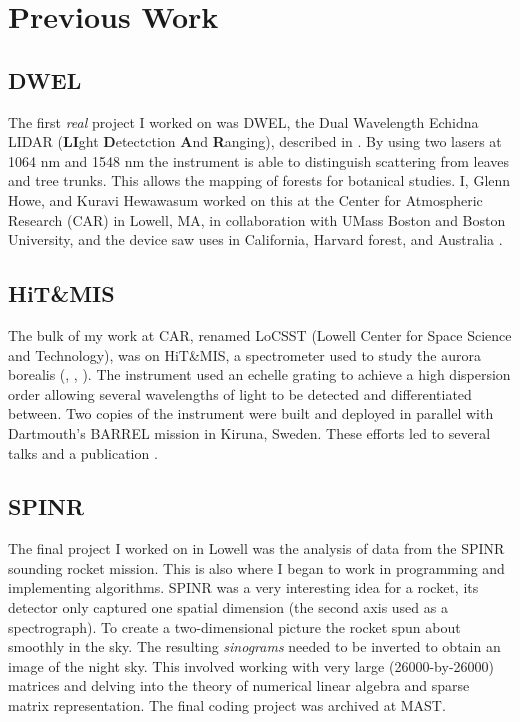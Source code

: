 \documentclass{article}
\theoremstyle{plain}
\begin{document}
    \section{Previous Work}
        \subsection{DWEL}
            The first \textit{real} project I worked on was DWEL, the
            Dual Wavelength Echidna LIDAR
            (\textbf{LI}ght \textbf{D}etectction \textbf{A}nd \textbf{R}anging),
            described in \cite{DWEL2012}.
            By using two lasers at 1064 nm and 1548 nm the instrument is able
            to distinguish scattering from leaves and tree trunks. This allows
            the mapping of forests for botanical studies. I, Glenn Howe, and
            Kuravi Hewawasum worked on this at the Center for Atmospheric
            Research (CAR) in Lowell, MA, in collaboration with UMass Boston
            and Boston University, and the device saw uses in California,
            Harvard forest, and Australia
            \cite{Li2016RadiometricCO}.
        \subsection{HiT\&MIS}
            The bulk of my work at CAR, renamed LoCSST
            (Lowell Center for Space Science and Technology), was on
            HiT\&MIS, a spectrometer used to study the aurora borealis
            (\cite{2011AGUFMSA13B1890C}, \cite{2014AGUFMSA13B4000H},
            \cite{2015AGUFMSA13B2369A}). The
            instrument used an echelle grating to achieve a high dispersion
            order allowing several wavelengths of light to be detected and
            differentiated between. Two copies of the instrument were built
            and deployed in parallel with Dartmouth's BARREL mission in
            Kiruna, Sweden. These efforts led to several talks and a
            publication \cite{AryalHewawasamMaguire2018DerivationHitAndMIS}.
        \subsection{SPINR}
            The final project I worked on in Lowell was the analysis of data
            from the SPINR sounding rocket mission. This is also where I began
            to work in programming and implementing algorithms. SPINR was a very
            interesting idea for a rocket, its detector only captured one
            spatial dimension (the second axis used as a spectrograph). To
            create a two-dimensional picture the rocket spun about smoothly
            in the sky. The resulting \textit{sinograms} needed to be inverted
            to obtain an image of the night sky. This involved working with
            very large (26000-by-26000) matrices and delving into the theory of
            numerical linear algebra and sparse matrix representation. The
            final coding project was archived at MAST.
\end{document}
